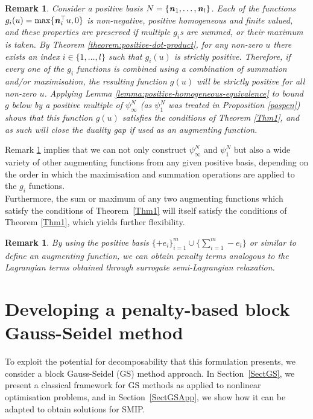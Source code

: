 \documentclass[preprint, 1p, review]{elsarticle}
\newtheorem{remark}[theorem]{Remark}
\newcommand{\bfemph}[1]{\textbf{\emph{#1}}}
\begin{document}
\begin{remark} \label{Remark8}
	Consider a positive basis $N=\left\{\bfemph{n}_{1},\dots , \bfemph{n}_{l}\right\}$. Each of the functions $g_i(u) = \max \{ \bfemph{n}_i^\top u, 0 \}$ is non-negative, positive homogeneous and finite valued, and these properties are preserved if multiple $g_i$s are summed, or their maximum is taken. By Theorem \ref{theorem:positive-dot-product}, for any non-zero $u$ there exists an index $i \in \{1,\dots,l\}$ such that $g_i(u)$ is strictly positive. Therefore, if every one of the $g_i$ functions is combined using a combination of summation and/or maximisation, the resulting function $g(u)$ will be strictly positive for all non-zero $u$. Applying Lemma \ref{lemma:positive-homogeneous-equivalence} to bound $g$ below by a positive multiple of $\psi_{\infty}^N$ (as $\psi_{1}^N$ was treated in Proposition \ref{pospen}) shows that this function $g(u)$ satisfies the conditions of Theorem \ref{Thm1}, and as such will close the duality gap if used as an augmenting function.	
\end{remark}

Remark \ref{Remark8} implies that we can not only construct $\psi_{\infty}^N$ and $\psi_{1}^N$ but also a wide variety of other augmenting functions from any given positive basis, depending on the order in which the maximisation and summation operations are applied to the $g_i$ functions.\\
	Furthermore, the sum or maximum of any two augmenting functions which satisfy the conditions of Theorem~\ref{Thm1} will itself satisfy the conditions of Theorem \ref{Thm1}, which yields further flexibility.

\begin{remark} \label{RemarkSurrogate}
	By using the positive basis $\{+e_i\}^{m}_{i=1} \cup \{ \sum_{i=1}^{m} - e_i\}$ or similar to define an augmenting function, we can obtain penalty terms analogous to the Lagrangian terms obtained through surrogate semi-Lagrangian relaxation.
\end{remark}

\section{Developing a penalty-based block Gauss-Seidel method} \label{sec3}

To exploit the potential for decomposability that this formulation presents, we consider a block Gauss-Seidel (GS) method approach.
In Section~\ref{SectGS}, we present a classical framework for GS methods as applied to nonlinear optimisation problems, and in Section~\ref{SectGSApp}, 
we show how it can be adapted to obtain solutions for SMIP.
\end{document}

